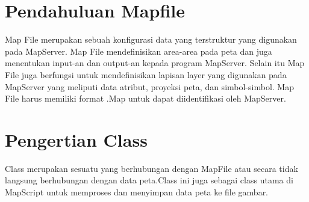 


\section{Pendahuluan Mapfile}
    Map  File  merupakan  sebuah  konfigurasi  data  yang terstruktur  yang  digunakan  pada  MapServer.  Map  File mendefinisikan  area-area  pada  peta  dan  juga  menentukan input-an dan output-an kepada program MapServer. Selain itu Map File juga berfungsi untuk mendefinisikan lapisan layer yang digunakan pada MapServer yang meliputi data atribut, proyeksi peta, dan simbol-simbol. Map File harus memiliki format .Map untuk dapat diidentifikasi oleh MapServer.

\section{Pengertian Class}
    Class merupakan sesuatu yang berhubungan dengan MapFile atau secara tidak langsung berhubungan dengan data peta.Class ini juga sebagai class utama di MapScript untuk memproses dan menyimpan data peta ke file gambar.
    
